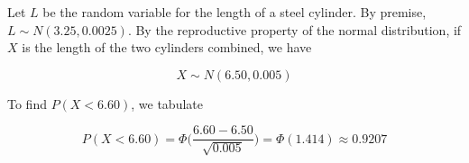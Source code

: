 \documentclass[10pt, oneside]{article}   	%
\theoremstyle{definition}
\begin{document}
\begin{enumerate}[label=10.\arabic*]
Let $L$ be the random variable for the length of a steel cylinder. By premise, $L \sim N(3.25, 0.0025)$. By the reproductive property of the normal distribution, if $X$ is the length of the two cylinders combined, we have

\[ X \sim N(6.50, 0.005) \]

To find $P(X < 6.60)$, we tabulate

\[ P(X < 6.60) = \Phi \bigg( \frac{6.60 - 6.50}{\sqrt{0.005}} \bigg) = \Phi(1.414) \approx \boxed{0.9207} \]

\end{enumerate}
\end{document}
